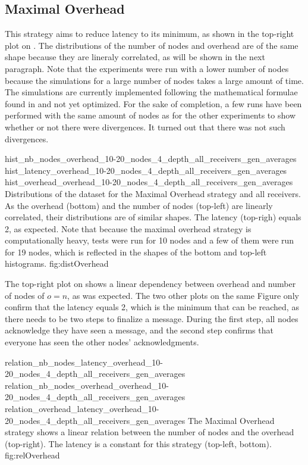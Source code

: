 \FloatBarrier
\subsection{Maximal Overhead}
This strategy aims to reduce latency to its minimum, as shown in the
top-right plot on . The distributions of the number
of nodes and overhead are of the same shape because they are lineraly
correlated, as will be shown in the next paragraph. 
Note that the experiments were run with a lower number of nodes because the
simulations for a large number of nodes takes a large amount of time. The
simulations are currently implemented following the mathematical formulae found
in \cite{abstractCBC} and not yet optimized. For the sake of completion, a few runs
have been performed with the same amount of nodes as for the other experiments
to show whether or not there were divergences. It turned out that there was not
such divergences. 

\triplefigure
    {hist_nb_nodes_overhead_10-20_nodes_4_depth_all_receivers_gen_averages}
    {hist_latency_overhead_10-20_nodes_4_depth_all_receivers_gen_averages}
    {hist_overhead_overhead_10-20_nodes_4_depth_all_receivers_gen_averages}
    {Distributions of the dataset for the Maximal Overhead strategy and all
    receivers. As the overhead (bottom) and the number of nodes (top-left) are
    linearly correlated, their distributions are of similar shapes. The
    latency (top-righ) equals 2, as expected. Note that because the maximal
    overhead strategy is computationally heavy, tests were run for 10 nodes and
    a few of them were run for 19 nodes, which is reflected in the shapes of the
    bottom and top-left histograms.}
    {fig:distOverhead}

The top-right plot on  shows a linear dependency between
overhead and number of nodes of \(o = n\), as was expected.  The two other plots
on the same Figure only confirm that the latency equals 2, which is the minimum
that can be reached, as there needs to be two steps to finalize a message.
During the first step, all nodes acknowledge they have seen a message, and the
second step confirms that everyone has seen the other nodes' acknowledgments.

\triplefigure
    {relation_nb_nodes_latency_overhead_10-20_nodes_4_depth_all_receivers_gen_averages}
    {relation_nb_nodes_overhead_overhead_10-20_nodes_4_depth_all_receivers_gen_averages}
    {relation_overhead_latency_overhead_10-20_nodes_4_depth_all_receivers_gen_averages}
    {The Maximal Overhead strategy shows a linear relation between the number of
    nodes and the overhead (top-right). The latency is a constant for this
    strategy (top-left, bottom).}
    {fig:relOverhead}

